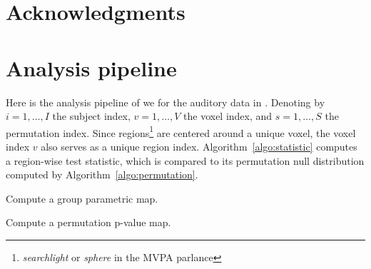 \documentclass[12pt,a4paper]{article}
\theoremstyle{definition}
\begin{document}
\section{Acknowledgments}




\newpage



\appendix


\newpage

\section{Analysis pipeline}
\label{apx:analysis}

Here is the analysis pipeline of \cite{stelzer_statistical_2013} we for the auditory data in \cite{gilron_quantifying_2016}.
Denoting by 
$i=1,\dots,I$ the subject index, 
$v=1,\dots,V$ the voxel index, and 
$s = 1,\dots,S$ the permutation index. 
Since regions\footnote{\emph{searchlight} or \emph{sphere} in the MVPA parlance} are centered around a unique voxel, the voxel index $v$ also serves as a unique region index.
Algorithm~\ref{algo:statistic} computes a region-wise test statistic, which is compared to its permutation null distribution computed by Algorithm~\ref{algo:permutation}.


\begin{algorithm}[H]
\caption{Compute a group parametric map.}
\label{algo:statistic}

\end{algorithm}


\begin{algorithm}[H]
\caption{Compute a permutation p-value map.} 
\label{algo:permutation}

\end{algorithm}
\end{document}
